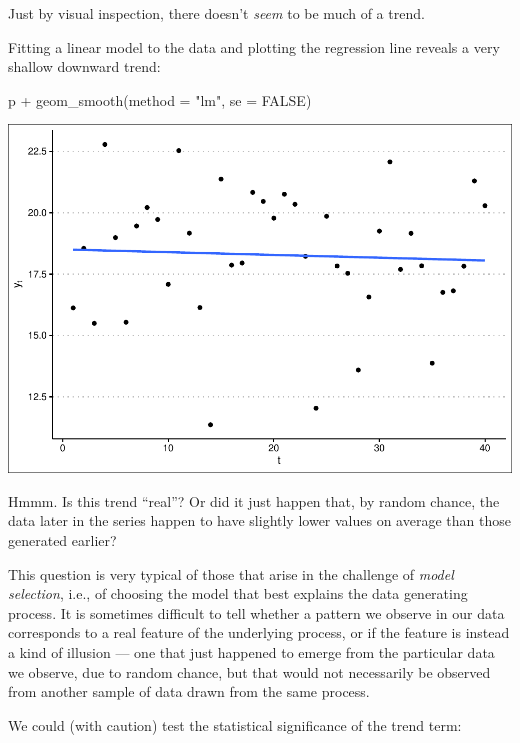 \documentclass[
]{book}
\newenvironment{Shaded}{\begin{snugshade}}{\end{snugshade}}
\newcommand{\AttributeTok}[1]{\textcolor[rgb]{0.77,0.63,0.00}{#1}}
\newcommand{\ConstantTok}[1]{\textcolor[rgb]{0.00,0.00,0.00}{#1}}
\newcommand{\FunctionTok}[1]{\textcolor[rgb]{0.00,0.00,0.00}{#1}}
\newcommand{\NormalTok}[1]{#1}
\newcommand{\SpecialCharTok}[1]{\textcolor[rgb]{0.00,0.00,0.00}{#1}}
\newcommand{\StringTok}[1]{\textcolor[rgb]{0.31,0.60,0.02}{#1}}
\begin{document}
Just by visual inspection, there doesn't \emph{seem} to be much of a trend.

Fitting a linear model to the data and plotting the regression line reveals a very shallow downward trend:

\begin{Shaded}
\begin{Highlighting}[]
\NormalTok{p }\SpecialCharTok{+} \FunctionTok{geom\_smooth}\NormalTok{(}\AttributeTok{method =} \StringTok{"lm"}\NormalTok{, }\AttributeTok{se =} \ConstantTok{FALSE}\NormalTok{)}
\end{Highlighting}
\end{Shaded}

\includegraphics{graphics/unnamed-chunk-55-1.pdf}

Hmmm. Is this trend ``real''? Or did it just happen that, by random chance, the data later in the series happen to have slightly lower values on average than those generated earlier?

This question is very typical of those that arise in the challenge of \emph{model selection}, i.e., of choosing the model that best explains the data generating process. It is sometimes difficult to tell whether a pattern we observe in our data corresponds to a real feature of the underlying process, or if the feature is instead a kind of illusion --- one that just happened to emerge from the particular data we observe, due to random chance, but that would not necessarily be observed from another sample of data drawn from the same process.

We could (with caution) test the statistical significance of the trend term:
\end{document}

